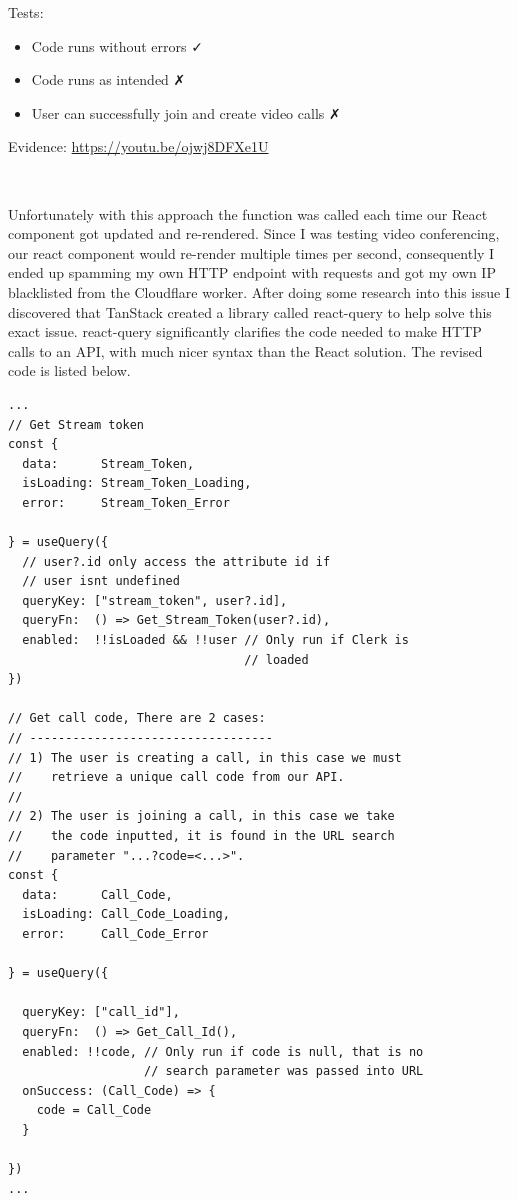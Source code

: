 {\sffamily Tests:}

\begin{itemize}
  \item Code runs without errors \faCheck \\
  \item Code runs as intended \faClose \\
  \item User can successfully join and create video calls \faClose \\
\end{itemize}

{\sffamily Evidence:} \url{https://youtu.be/ojwj8DFXe1U}

{\color{gray} \hrulefill} \\ \vspace{0.2cm}

Unfortunately with this approach the 
function was called each time our React component got updated and
re-rendered. Since I was testing video conferencing, our react
component would re-render multiple times per second, consequently
I ended up spamming my own HTTP endpoint with requests and got
my own IP blacklisted from the Cloudflare worker. After doing
some research into this issue I discovered that TanStack
created a library called react-query to help solve this
exact issue. react-query significantly clarifies the code
needed to make HTTP calls to an API, with much nicer syntax
than the React  solution. The revised code is
listed below.

\begin{verbatim}
...
// Get Stream token
const {
  data:      Stream_Token,
  isLoading: Stream_Token_Loading,
  error:     Stream_Token_Error

} = useQuery({
  // user?.id only access the attribute id if
  // user isnt undefined
  queryKey: ["stream_token", user?.id],
  queryFn:  () => Get_Stream_Token(user?.id),
  enabled:  !!isLoaded && !!user // Only run if Clerk is
                                 // loaded
})

// Get call code, There are 2 cases:
// ----------------------------------
// 1) The user is creating a call, in this case we must
//    retrieve a unique call code from our API.
//
// 2) The user is joining a call, in this case we take
//    the code inputted, it is found in the URL search
//    parameter "...?code=<...>".
const {
  data:      Call_Code,
  isLoading: Call_Code_Loading,
  error:     Call_Code_Error

} = useQuery({

  queryKey: ["call_id"],
  queryFn:  () => Get_Call_Id(),
  enabled: !!code, // Only run if code is null, that is no
                   // search parameter was passed into URL
  onSuccess: (Call_Code) => {
    code = Call_Code
  }

})
...
\end{verbatim}

